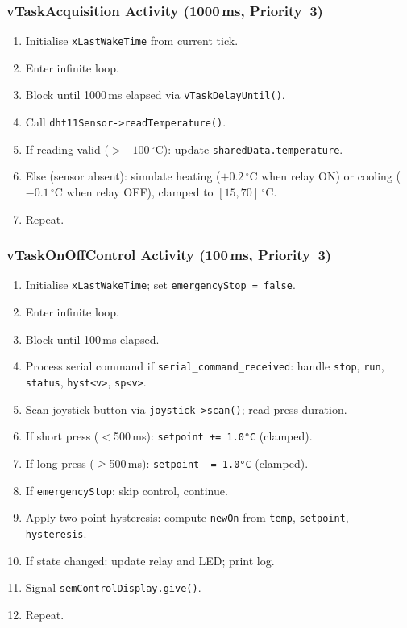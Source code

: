 \documentclass[12pt]{article}
\begin{document}
\subsubsection*{vTaskAcquisition Activity (1000\,ms, Priority~3)}

\begin{enumerate}
    \item Initialise \texttt{xLastWakeTime} from current tick.
    \item Enter infinite loop.
    \item Block until 1000\,ms elapsed via \texttt{vTaskDelayUntil()}.
    \item Call \texttt{dht11Sensor->readTemperature()}.
    \item If reading valid ($>-100\,^{\circ}$C): update \texttt{sharedData.temperature}.
    \item Else (sensor absent): simulate heating ($+0.2\,^{\circ}$C when relay ON)
          or cooling ($-0.1\,^{\circ}$C when relay OFF), clamped to
          $[15, 70]\,^{\circ}$C.
    \item Repeat.
\end{enumerate}

\subsubsection*{vTaskOnOffControl Activity (100\,ms, Priority~3)}

\begin{enumerate}
    \item Initialise \texttt{xLastWakeTime}; set \texttt{emergencyStop = false}.
    \item Enter infinite loop.
    \item Block until 100\,ms elapsed.
    \item Process serial command if \texttt{serial\_command\_received}: handle
          \texttt{stop}, \texttt{run}, \texttt{status}, \texttt{hyst<v>},
          \texttt{sp<v>}.
    \item Scan joystick button via \texttt{joystick->scan()}; read press duration.
    \item If short press ($<$500\,ms): \texttt{setpoint += 1.0°C} (clamped).
    \item If long press ($\ge$500\,ms): \texttt{setpoint -= 1.0°C} (clamped).
    \item If \texttt{emergencyStop}: skip control, continue.
    \item Apply two-point hysteresis: compute \texttt{newOn} from
          \texttt{temp}, \texttt{setpoint}, \texttt{hysteresis}.
    \item If state changed: update relay and LED; print log.
    \item Signal \texttt{semControlDisplay.give()}.
    \item Repeat.
\end{enumerate}
\end{document}
